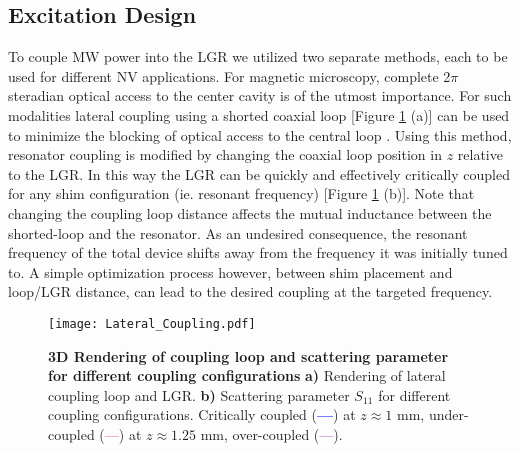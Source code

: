 \subsection{Excitation Design} \label{excitation}

To couple MW power into the LGR we utilized two separate methods, each to be used for different NV applications. For magnetic  microscopy, complete 2$\pi$ steradian optical access to the center cavity is of the utmost importance. For such modalities lateral coupling using a shorted coaxial loop [Figure \ref{LGR_Lateral} (a)] can be used to minimize the blocking of optical access to the central loop \cite{koskinen1992the}. Using this method, resonator coupling is modified by changing the coaxial loop position in $z$ relative to the LGR. In this way the LGR can be quickly and effectively critically coupled for any shim configuration (ie. resonant frequency) [Figure \ref{LGR_Lateral} (b)]. Note that changing the coupling loop distance affects the mutual inductance between the shorted-loop and the resonator. As an undesired consequence, the resonant frequency of the total device shifts away from the frequency it was initially tuned to. A simple optimization process however, between shim placement and loop/LGR distance, can lead to the desired coupling at the targeted frequency.

\begin{figure}[t!]
\centering
\texttt{[image: Lateral\_Coupling.pdf]}  
\caption{\textbf{3D Rendering of coupling loop and scattering parameter for different coupling configurations} \textbf{a)} Rendering of lateral coupling loop and LGR. \textbf{b)} Scattering parameter $S_{11}$ for different coupling configurations. Critically coupled (\textcolor{blue}{\textbf{---}}) at $z \approx 1$ mm, under-coupled (\textcolor{red}{---}) at $z \approx 1.25$ mm, over-coupled (\textcolor{purple}{---}). }
\label{LGR_Lateral}
\end{figure}

